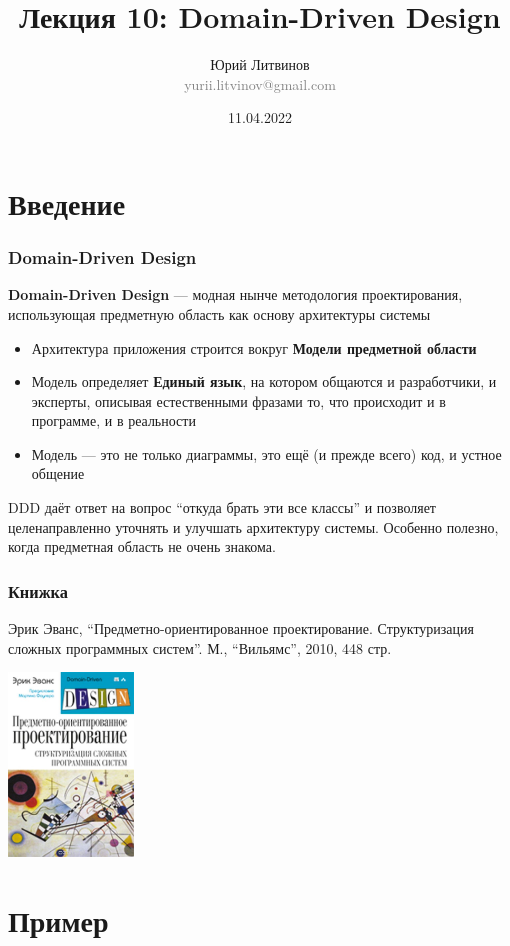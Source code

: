 \documentclass[xetex,mathserif,serif]{beamer}
\title{Лекция 10: Domain-Driven Design}
\author[Юрий Литвинов]{Юрий Литвинов\\\small{\textcolor{gray}{yurii.litvinov@gmail.com}}}
\date{11.04.2022}
\begin{document}
    
    \frame{\titlepage}

    \section{Введение}

    \begin{frame}
        \frametitle{Domain-Driven Design}
        \textbf{Domain-Driven Design} --- модная нынче методология проектирования, использующая предметную область как основу архитектуры системы
        \begin{itemize}
            \item Архитектура приложения строится вокруг \textbf{Модели предметной области}
            \item Модель определяет \textbf{Единый язык}, на котором общаются и разработчики, и эксперты, описывая естественными фразами то, что происходит и в программе, и в реальности
            \item Модель --- это не только диаграммы, это ещё (и прежде всего) код, и устное общение
        \end{itemize}
        DDD даёт ответ на вопрос ``откуда брать эти все классы'' и позволяет целенаправленно уточнять и улучшать архитектуру системы. 
        Особенно полезно, когда предметная область не очень знакома.
    \end{frame}

    \begin{frame}
        \frametitle{Книжка}
        Эрик Эванс, ``Предметно-ориентированное проектирование. Структуризация сложных программных систем''. М., ``Вильямс'', 2010, 448 стр.
        \begin{center}
            \includegraphics[width=0.25\textwidth]{dddCover.jpg}
        \end{center}
    \end{frame}

    \section{Пример}
\end{document}
